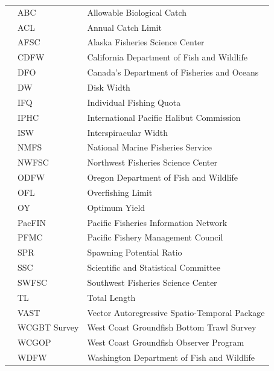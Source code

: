\begin{center}
\begin{table}[ht]
\begin{tabular}{rll}
  & ABC & Allowable Biological Catch \\ 
  & ACL & Annual Catch Limit \\ 
  & AFSC & Alaska Fisheries Science Center \\ 
  & CDFW & California Department of Fish and Wildlife \\ 
  & DFO & Canada's Department of Fisheries and Oceans \\ 
  & DW & Disk Width \\ 
  & IFQ & Individual Fishing Quota \\ 
  & IPHC & International Pacific Halibut Commission \\ 
  & ISW & Interspiracular Width \\ 
  & NMFS & National Marine Fisheries Service \\ 
  & NWFSC & Northwest Fisheries Science Center \\ 
  & ODFW & Oregon Department of Fish and Wildlife \\ 
  & OFL & Overfishing Limit \\ 
  & OY & Optimum Yield \\ 
  & PacFIN & Pacific Fisheries Information Network \\ 
  & PFMC & Pacific Fishery Management Council \\ 
  & SPR & Spawning Potential Ratio \\ 
  & SSC & Scientific and Statistical Committee \\ 
  & SWFSC & Southwest Fisheries Science Center \\ 
  & TL & Total Length \\ 
  & VAST & Vector Autoregressive Spatio-Temporal Package \\ 
  & WCGBT Survey & West Coast Groundfish Bottom Trawl Survey \\ 
  & WCGOP & West Coast Groundfish Observer Program \\ 
  & WDFW & Washington Department of Fish and Wildlife \\ 
\end{tabular}
\end{table}

\renewcommand{\arraystretch}{1}

\maketitle

\setcounter{page}{1}
\end{center}


